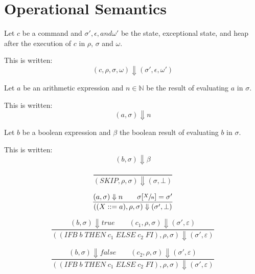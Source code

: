 \section{Operational Semantics}

\begin{notation}
Let $c$ be a command and $\sigma',\epsilon, and \omega'$ be the state, exceptional state, and heap after the execution of $c$ in $\rho$, $\sigma$ and $\omega$.

This is written:
\begin{equation}
(c,\rho,\sigma,\omega) \Downarrow (\sigma',\epsilon,\omega')
\end{equation}
\end{notation}

\begin{notation}
Let $a$ be an arithmetic expression and $n\in\mathbb{N}$ be the result of evaluating $a$ in $\sigma$.

This is written:
\begin{equation}
(a,\sigma) \Downarrow n
\end{equation}
\end{notation}

\begin{notation}
Let $b$ be a boolean expression and $\beta$ the boolean result of evaluating $b$ in $\sigma$.

This is written:
\begin{equation}
(b,\sigma) \Downarrow \beta
\end{equation}
\end{notation}

\begin{equation}
\frac{}{(SKIP, \rho, \sigma) \Downarrow (\sigma, \bot)}
\end{equation}

\begin{equation}
\frac{(a, \sigma) \Downarrow n \qquad \sigma[\sfrac{X}{n}] = \sigma'}{((X ::= a), \rho, \sigma) \Downarrow (\sigma', \bot)}
\end{equation}

\begin{equation}
\frac{(b, \sigma) \Downarrow true \qquad (c_1, \rho, \sigma) \Downarrow (\sigma', \varepsilon)}{((IFB\; b\; THEN\; c_1\; ELSE\; c_2\; FI), \rho, \sigma) \Downarrow (\sigma', \varepsilon)}
\end{equation}

\begin{equation}
\frac{(b, \sigma) \Downarrow false \qquad (c_2, \rho, \sigma) \Downarrow (\sigma', \varepsilon)}{((IFB\; b\; THEN\; c_1\; ELSE\; c_2\; FI), \rho, \sigma) \Downarrow (\sigma', \varepsilon)}
\end{equation}

